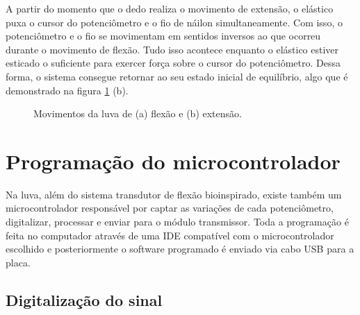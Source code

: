 \documentclass[
	12pt,				%
	openright,			%
	oneside,			%
	a4paper,			%
	english,			%
	brazil				%
	]{abntex2}
\begin{document}
		A partir do momento que o dedo realiza o movimento de extensão, o elástico puxa o cursor do potenciômetro e o fio de náilon simultaneamente. Com isso, o potenciômetro e o fio se movimentam em sentidos inversos ao que ocorreu durante o movimento de flexão. Tudo isso acontece enquanto o elástico estiver esticado o suficiente para exercer força sobre o cursor do potenciômetro. Dessa forma, o sistema consegue retornar ao seu estado inicial de equilíbrio, algo que é demonstrado na figura \ref{Fig:glove-flex-and-extend2} (b).
		

	\begin{figure}[!htb]
		 \centering
		 \caption{ Movimentos da luva de (a) flexão e (b) extensão.} 
		 \centering
		 \label{Fig:glove-flex-and-extend2}
	\end{figure}


	
		\section{Programação do microcontrolador}

		Na luva, além do sistema transdutor de flexão bioinspirado, existe também um microcontrolador responsável por captar as variações de cada potenciômetro, digitalizar, processar e enviar para o módulo transmissor. Toda a programação é feita no computador através de uma IDE compatível com o microcontrolador escolhido e posteriormente o software programado é enviado via cabo USB para a placa.  
		
		\subsection{Digitalização do sinal}
\end{document}
